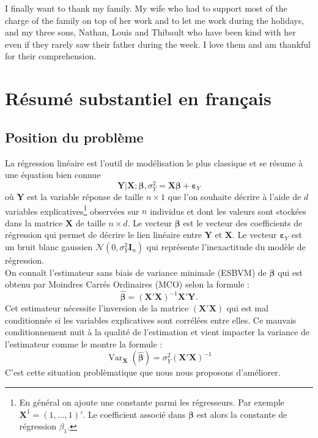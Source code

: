 \documentclass[12pt,a4paper]{report}
\begin{document}
	I finally want to thank my family. My wife who had to support most of the charge of the family on top of her work and to let me work during the holidays, and my three sons, Nathan, Louis and Thibault who have been kind with her even if they rarely saw their father during the week. I love them and am thankful for their comprehension.




\tableofcontents
\chapter{Résumé substantiel en français}
	\section{Position du problème}
	La régression linéaire est l'outil de modélisation le plus classique et se résume à une équation bien connue%
	\begin{equation}
		\boldsymbol{Y}|\boldsymbol{X};\boldsymbol{\beta},\sigma^2_Y=\boldsymbol{X}\boldsymbol{\beta}+\boldsymbol{\varepsilon}_Y \nonumber 
	\end{equation}
	où $\boldsymbol{Y}$ est la variable réponse de taille $n\times 1$ que l'on souhaite décrire à l'aide de $d$ variables explicatives\footnote{En général on ajoute une constante parmi les régresseurs. Par exemple $\boldsymbol{X}^1=(1,\ldots,1)'$. Le coefficient associé dans $\boldsymbol{\beta}$ est alors la constante de régression $\beta_1$.} observées sur $n$ individus et dont les valeurs sont stockées dans la matrice $\boldsymbol{X}$ de taille $n\times d$. Le vecteur $\boldsymbol{\beta}$ est le vecteur des coefficients de régression qui permet de décrire le lien linéaire entre $\boldsymbol{Y}$ et $\boldsymbol{X}$. Le vecteur $\boldsymbol{\varepsilon}_Y$  est un bruit blanc gaussien $\mathcal{N}(0,\sigma_Y^2\boldsymbol{I}_n)$ qui représente l'inexactitude du modèle de régression.\\
	
	On connaît l'estimateur sans biais de variance minimale (ESBVM) de $\boldsymbol{\beta}$ qui est obtenu par Moindres Carrés Ordinaires (MCO) selon la formule  :
	\begin{equation}
		\hat{\boldsymbol{\beta}}=(\boldsymbol{X}'\boldsymbol{X})^{-1}\boldsymbol{X}'\boldsymbol{Y}.  \nonumber 
	\end{equation}
	Cet estimateur nécessite l'inversion de la matrice $(\boldsymbol{X}'\boldsymbol{X})$ qui est mal conditionnée si les variables explicatives sont corrélées entre elles. Ce mauvais conditionnement nuit à la qualité de l'estimation et vient impacter la variance de l'estimateur comme le montre la formule :
	\begin{equation}
		\operatorname{Var}_{\boldsymbol{X}}(\hat{\boldsymbol{\beta}})=\sigma_Y^2(\boldsymbol{X}'\boldsymbol{X})^{-1}  \nonumber 
	\end{equation}
	C'est cette situation problèmatique que nous nous proposons d'améliorer.
\end{document}
